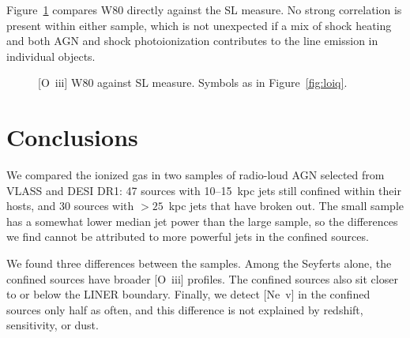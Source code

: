 \documentclass[linenumbers,trackchanges]{aastex701}
\begin{document}
Figure~\ref{fig:w80bpt} compares W80 directly against the SL measure. No strong correlation is present within either sample, which is not unexpected if a mix of shock heating and both AGN and shock photoionization contributes to the line emission in individual objects.

\begin{figure}
\caption{[O~{\sc iii}] W80 against SL measure. Symbols as in Figure~\ref{fig:loiq}.}
\label{fig:w80bpt}
\end{figure}



\section{Conclusions}
We compared the ionized gas in two samples of radio-loud AGN selected from VLASS and DESI DR1: 47 sources with 10--15~kpc jets still confined within their hosts, and 30 sources with $>25$~kpc jets that have broken out. The small sample has a somewhat lower median jet power than the large sample, so the differences we find cannot be attributed to more powerful jets in the confined sources.

We found three differences between the samples. Among the Seyferts alone, the confined sources have broader [O~{\sc iii}] profiles. The confined sources also sit closer to or below the LINER boundary. Finally, we detect [Ne~{\sc v}] in the confined sources only half as often, and this difference is not explained by redshift, sensitivity, or dust. 
\end{document}
